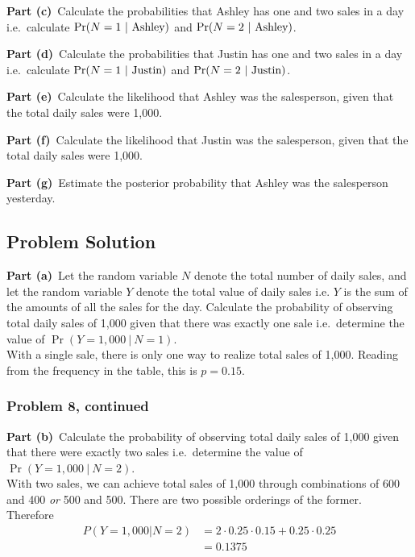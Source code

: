 \documentclass[12pt]{article}
\theoremstyle{definition}
\begin{document}
\bigskip
\noindent
{\bf Part (c)}\ Calculate the probabilities that Ashley has one and two sales in a day i.e.\ calculate $\Pr(N = 1\ |\ \hbox{Ashley})$ and $\Pr(N = 2\ |\ \hbox{Ashley})$.


\bigskip
\noindent
{\bf Part (d)}\ Calculate the probabilities that Justin has one and two sales in a day i.e.\ calculate $\Pr(N = 1\ |\ \hbox{Justin})$ and $\Pr(N = 2\ |\ \hbox{Justin})$.

\bigskip
\noindent
{\bf Part (e)}\ Calculate the likelihood that Ashley was the salesperson, given that the total daily sales were 1,000.


\bigskip
\noindent
{\bf Part (f)}\ Calculate the likelihood that Justin was the salesperson, given that the total daily sales were 1,000.



\bigskip
\noindent
{\bf Part (g)}\ Estimate the posterior probability that Ashley was the salesperson yesterday.


\subsection*{Problem Solution}

\bigskip
\noindent
{\bf Part (a)}\ Let the random variable $N$ denote the total number of daily sales, and let the random variable $Y$ denote the total value of daily sales i.e. $Y$ is the sum of the amounts of all the sales for the day. Calculate the probability of observing total daily sales of 1,000 given that there was exactly one sale i.e.\ determine the value of $\Pr(Y = 1,000\ |\ N = 1)$.\\

With a single sale, there is only one way to realize total sales of 1,000. Reading from the frequency in the table, this is $p = 0.15$.




\newpage
\subsubsection*{Problem 8, continued}
\noindent
{\bf Part (b)}\ Calculate the probability of observing total daily sales of 1,000 given that there were exactly two sales i.e.\ determine the value of $\Pr(Y = 1,000\ |\ N = 2)$.\\

With two sales, we can achieve total sales of 1,000 through combinations of 600 and 400 \textit{or} 500 and 500. There are two possible orderings of the former. Therefore \\
\begin{align*}
P(Y = 1,000 |N = 2) &= 2 \cdot 0.25 \cdot 0.15 + 0.25 \cdot 0.25\\
&= 0.1375
\end{align*}
\end{document}
